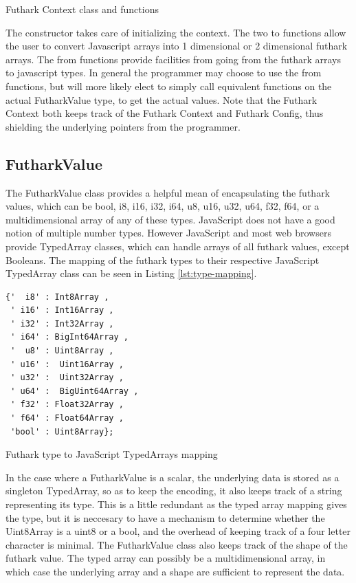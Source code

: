 \documentclass[11pt]{book}
\begin{document}
\begin{listing}[H] 
        \inputminted[fontsize=\small,baselinestretch=0.5,linenos]{javascript}{code/compiler/c-backend/libnames.js}
        \caption{Futhark Context class and functions}
        \label{lst:jsapi}    
\end{listing} 
The constructor takes care of initializing the context. The two to functions allow the user to convert Javascript arrays into 1 dimensional or 2 dimensional futhark arrays. The from functions provide facilities from going from the futhark arrays to javascript types. In general the programmer may choose to use the from functions, but will more likely elect to simply call equivalent functions on the actual FutharkValue type, to get the actual values. Note that the Futhark Context both keeps track of the Futhark Context and Futhark Config, thus shielding the underlying pointers from the programmer.


\subsection{FutharkValue}

The FutharkValue class provides a helpful mean of encapsulating the futhark values, which can be
bool, i8, i16, i32, i64, u8, u16, u32, u64, f32, f64, or a multidimensional array of any of these types. JavaScript does not have a good notion of multiple number types. However JavaScript and most web browsers provide TypedArray classes, which can handle arrays of all futhark values, except Booleans. The mapping of the futhark types to their respective JavaScript TypedArray class can be seen in Listing \ref{lst:type-mapping}.

\begin{listing}[H]
\begin{verbatim}
{'  i8' : Int8Array ,
 ' i16' : Int16Array ,
 ' i32' : Int32Array ,
 ' i64' : BigInt64Array ,
 '  u8' : Uint8Array ,
 ' u16' :  Uint16Array ,
 ' u32' :  Uint32Array ,
 ' u64' :  BigUint64Array ,
 ' f32' : Float32Array ,
 ' f64' : Float64Array ,
 'bool' : Uint8Array};
\end{verbatim}
\caption{Futhark type to JavaScript TypedArrays mapping}
\label{lst:type-mapping}
\end{listing}

In the case where a FutharkValue is a scalar, the underlying data is stored as a singleton TypedArray, so as to keep the encoding, it also keeps track of a string representing its type. This is a little redundant as the typed array mapping gives the type, but it is neccesary to have a mechanism to determine whether the Uint8Array is a uint8 or a bool, and the overhead of keeping track of a four letter character is minimal. The FutharkValue class also keeps track of the shape of the futhark value. The typed array can possibly be a multidimensional array, in which case the underlying array and a shape are sufficient to represent the data.
\end{document}
